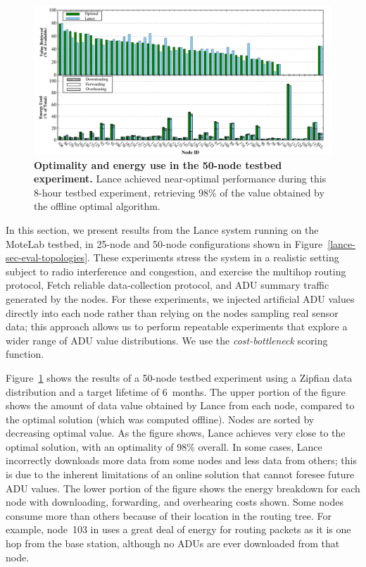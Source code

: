 \begin{figure}[t]
\label{lance-sec-eval-figvolcano}
\begin{center}
\includegraphics[width=1.0\hsize]{./4-lance/figs/gwa/big/FIGURE.pdf}
\end{center}
\caption{\textbf{Optimality and energy use in the 50-node testbed
experiment.}
Lance achieved near-optimal performance during this 8-hour testbed
experiment, retrieving 98\% of the value obtained by the offline optimal
algorithm.}
\end{figure}

In this section, we present results from the Lance system running on the
MoteLab testbed, in 25-node and 50-node configurations shown in
Figure~\ref{lance-sec-eval-topologies}. These experiments stress the system
in a realistic setting subject to radio interference and congestion, and
exercise the multihop routing protocol, Fetch reliable data-collection
protocol, and ADU summary traffic generated by the nodes. For these
experiments, we injected artificial ADU values directly into each node rather
than relying on the nodes sampling real sensor data; this approach allows us
to perform repeatable experiments that explore a wider range of ADU value
distributions.  We use the \emph{cost-bottleneck} scoring function. 

Figure~\ref{lance-sec-eval-figvolcano} shows the results of a 50-node testbed
experiment using a Zipfian data distribution and a target lifetime of
6~months.  The upper portion of the figure shows the amount of data value
obtained by Lance from each node, compared to the optimal solution (which was
computed offline). Nodes are sorted by decreasing optimal value. As the
figure shows, Lance achieves very close to the optimal solution, with an
optimality of 98\% overall.  In some cases, Lance incorrectly downloads more
data from some nodes and less data from others; this is due to the inherent
limitations of an online solution that cannot foresee future ADU values.  The
lower portion of the figure shows the energy breakdown for each node with
downloading, forwarding, and overhearing costs shown.  Some nodes consume
more than others because of their location in the routing tree. For example,
node~103 in uses a great deal of energy for routing packets as it is one hop
from the base station, although no ADUs are ever downloaded from that node.

